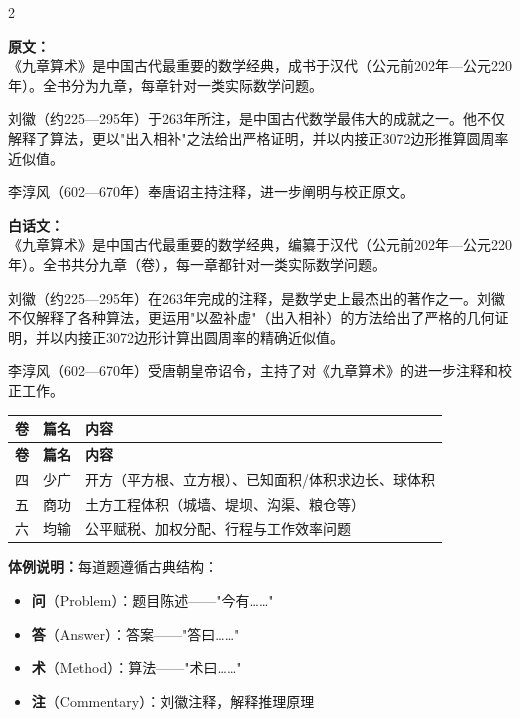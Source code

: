 \documentclass[11pt,a4paper]{article}
\begin{document}
\begin{paracol}{2}

\textbf{原文：}\\
《九章算术》是中国古代最重要的数学经典，成书于汉代（公元前202年—公元220年）。全书分为九章，每章针对一类实际数学问题。

刘徽（约225—295年）于263年所注，是中国古代数学最伟大的成就之一。他不仅解释了算法，更以"出入相补"之法给出严格证明，并以内接正3072边形推算圆周率近似值。

李淳风（602—670年）奉唐诏主持注释，进一步阐明与校正原文。

\switchcolumn

\textbf{白话文：}\\
《九章算术》是中国古代最重要的数学经典，编纂于汉代（公元前202年—公元220年）。全书共分九章（卷），每一章都针对一类实际数学问题。

刘徽（约225—295年）在263年完成的注释，是数学史上最杰出的著作之一。刘徽不仅解释了各种算法，更运用"以盈补虚"（出入相补）的方法给出了严格的几何证明，并以内接正3072边形计算出圆周率的精确近似值。

李淳风（602—670年）受唐朝皇帝诏令，主持了对《九章算术》的进一步注释和校正工作。

\end{paracol}

\vspace{1cm}

\begin{center}
\begin{longtable}{|c|l|p{4.5cm}|}
\hline
\textbf{卷} & \textbf{篇名} & \textbf{内容} \\
\hline
\endfirsthead
\hline
\textbf{卷} & \textbf{篇名} & \textbf{内容} \\
\hline
\endhead
四 & 少广 & 开方（平方根、立方根）、已知面积/体积求边长、球体积 \\
五 & 商功 & 土方工程体积（城墙、堤坝、沟渠、粮仓等） \\
六 & 均输 & 公平赋税、加权分配、行程与工作效率问题 \\
\hline
\end{longtable}
\end{center}

\vspace{0.5cm}

\noindent
\textbf{体例说明：}每道题遵循古典结构：
\begin{itemize}[leftmargin=2em]
  \item \textbf{问}（\textcolor{problemcolor}{Problem}）：题目陈述——"今有……"
  \item \textbf{答}（\textcolor{answercolor}{Answer}）：答案——"答曰……"
  \item \textbf{术}（\textcolor{methodcolor}{Method}）：算法——"术曰……"
  \item \textbf{注}（\textcolor{commentarycolor}{Commentary}）：刘徽注释，解释推理原理
\end{itemize}
\end{document}
